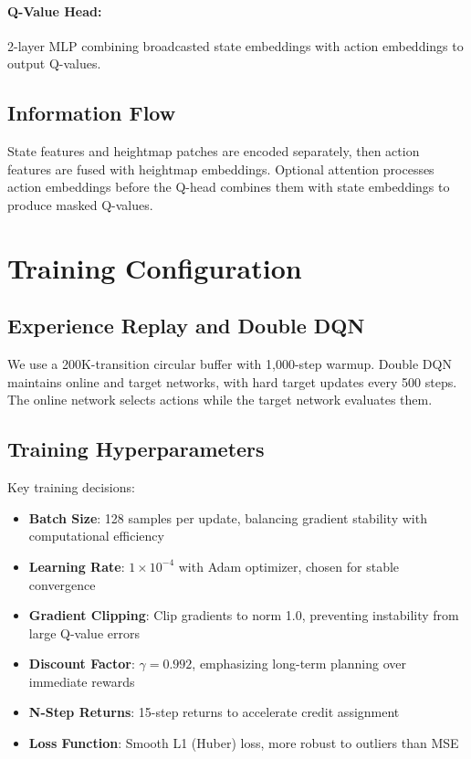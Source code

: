 \paragraph{Q-Value Head:} 2-layer MLP combining broadcasted state embeddings with action embeddings to output Q-values.

\subsection{Information Flow}

State features and heightmap patches are encoded separately, then action features are fused with heightmap embeddings. Optional attention processes action embeddings before the Q-head combines them with state embeddings to produce masked Q-values.

\section{Training Configuration}

\subsection{Experience Replay and Double DQN}

We use a 200K-transition circular buffer with 1,000-step warmup. Double DQN maintains online and target networks, with hard target updates every 500 steps. The online network selects actions while the target network evaluates them.

\subsection{Training Hyperparameters}

Key training decisions:

\begin{itemize}
    \item \textbf{Batch Size}: 128 samples per update, balancing gradient stability with computational efficiency
    \item \textbf{Learning Rate}: $1 \times 10^{-4}$ with Adam optimizer, chosen for stable convergence
    \item \textbf{Gradient Clipping}: Clip gradients to norm 1.0, preventing instability from large Q-value errors
    \item \textbf{Discount Factor}: $\gamma = 0.992$, emphasizing long-term planning over immediate rewards
    \item \textbf{N-Step Returns}: 15-step returns to accelerate credit assignment
    \item \textbf{Loss Function}: Smooth L1 (Huber) loss, more robust to outliers than MSE
\end{itemize}

